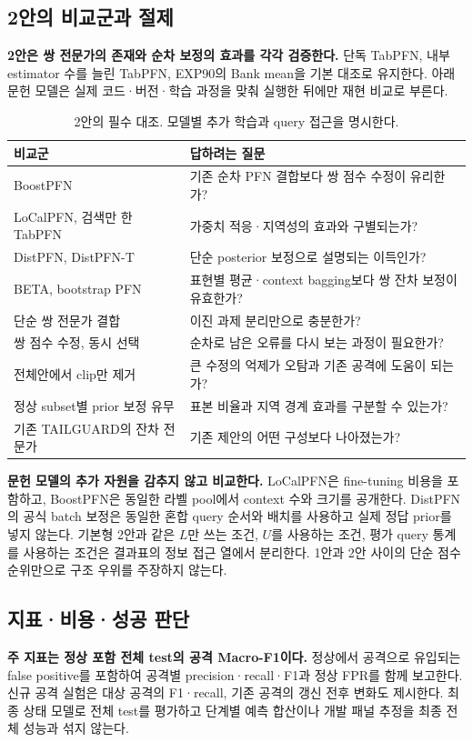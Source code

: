\subsection{2안의 비교군과 절제}
\textbf{2안은 쌍 전문가의 존재와 순차 보정의 효과를 각각 검증한다.} 단독 TabPFN, 내부 estimator 수를 늘린 TabPFN, EXP90의 Bank mean을 기본 대조로 유지한다. 아래 문헌 모델은 실제 코드·버전·학습 과정을 맞춰 실행한 뒤에만 재현 비교로 부른다.
\begin{table}[H]\centering\small
\caption{2안의 필수 대조. 모델별 추가 학습과 query 접근을 명시한다.}
\begin{tabularx}{\linewidth}{p{.32\linewidth}Y}
\toprule
비교군 & 답하려는 질문\\\midrule
BoostPFN & 기존 순차 PFN 결합보다 쌍 점수 수정이 유리한가?\\
LoCalPFN, 검색만 한 TabPFN & 가중치 적응·지역성의 효과와 구별되는가?\\
DistPFN, DistPFN-T & 단순 posterior 보정으로 설명되는 이득인가?\\
BETA, bootstrap PFN & 표현별 평균·context bagging보다 쌍 잔차 보정이 유효한가?\\
단순 쌍 전문가 결합 & 이진 과제 분리만으로 충분한가?\\
쌍 점수 수정, 동시 선택 & 순차로 남은 오류를 다시 보는 과정이 필요한가?\\
전체안에서 clip만 제거 & 큰 수정의 억제가 오탐과 기존 공격에 도움이 되는가?\\
정상 subset별 prior 보정 유무 & 표본 비율과 지역 경계 효과를 구분할 수 있는가?\\
기존 TAILGUARD의 잔차 전문가 & 기존 제안의 어떤 구성보다 나아졌는가?\\\bottomrule
\end{tabularx}
\end{table}

\textbf{문헌 모델의 추가 자원을 감추지 않고 비교한다.} LoCalPFN은 fine-tuning 비용을 포함하고, BoostPFN은 동일한 라벨 pool에서 context 수와 크기를 공개한다. DistPFN의 공식 batch 보정은 동일한 혼합 query 순서와 배치를 사용하고 실제 정답 prior를 넣지 않는다. 기본형 2안과 같은 $L$만 쓰는 조건, $U$를 사용하는 조건, 평가 query 통계를 사용하는 조건은 결과표의 정보 접근 열에서 분리한다. 1안과 2안 사이의 단순 점수 순위만으로 구조 우위를 주장하지 않는다.

\subsection{지표·비용·성공 판단}
\textbf{주 지표는 정상 포함 전체 test의 공격 Macro-F1이다.} 정상에서 공격으로 유입되는 false positive를 포함하여 공격별 precision·recall·F1과 정상 FPR를 함께 보고한다. 신규 공격 실험은 대상 공격의 F1·recall, 기존 공격의 갱신 전후 변화도 제시한다. 최종 상태 모델로 전체 test를 평가하고 단계별 예측 합산이나 개발 패널 추정을 최종 전체 성능과 섞지 않는다.

